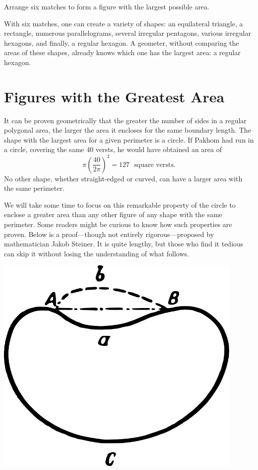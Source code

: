 \ques Arrange six matches to form a figure with the largest possible area.


\ans With six matches, one can create a variety of shapes: an equilateral triangle, a rectangle, numerous parallelograms, several irregular pentagons, various irregular hexagons, and finally, a regular hexagon. A geometer, without comparing the areas of these shapes, already knows which one has the largest area: a regular hexagon.


\section{Figures with the Greatest Area}
\label{sec-12.6}

It can be proven geometrically that the greater the number of sides in a regular polygonal area, the larger the area it encloses for the same boundary length. The shape with the largest area for a given perimeter is a circle. If Pakhom had run in a circle, covering the same 40 versts, he would have obtained an area of
\begin{equation*}%
 \pi \left( \frac{40}{2\pi} \right)^{2} = 127 \,\, \text{ square versts}. \end{equation*}
No other shape, whether straight-edged or curved, can have a larger area with the same perimeter.

We will take some time to focus on this remarkable property of the circle to enclose a greater area than any other figure of any shape with the same perimeter. Some readers might be curious to know how such properties are proven. Below is a proof—though not entirely rigorous—proposed by mathematician Jakob Steiner. It is quite lengthy, but those who find it tedious can skip it without losing the understanding of what follows.

\begin{marginfigure}[-1cm]%
\centering
\includegraphics[width=0.9\textwidth]{figures/ch-12/fig-177.pdf}
\end{marginfigure}


